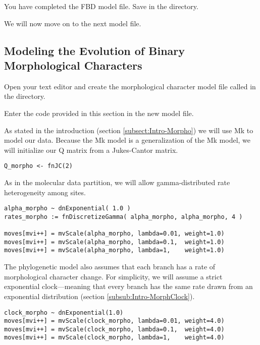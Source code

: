 {\begin{framed}
You have completed the FBD model file. Save  in the  directory.

We will now move on to the next model file.
\end{framed}}

\bigskip

\subsection{Modeling the Evolution of Binary Morphological Characters}\label{subsect:Exercise-ModelMorph}

{\begin{framed}
Open your text editor and create the morphological character model file called {\textcolor{red}{}} in the  directory.

Enter the \Rev code provided in this section in the new model file.
\end{framed}}

As stated in the introduction (section \ref{subsect:Intro-Morpho}) %
we will use Mk to model our data. 
Because the Mk model is a generalization of the Mk model, we will initialize our Q matrix from a Jukes-Cantor matrix.

{\tt \begin{snugshade*}
\begin{lstlisting}
Q_morpho <- fnJC(2)

\end{lstlisting}
\end{snugshade*}}


As in the molecular data partition, we will allow gamma-distributed rate heterogeneity among sites.
{\tt \begin{snugshade*}
\begin{lstlisting}
alpha_morpho ~ dnExponential( 1.0 )
rates_morpho := fnDiscretizeGamma( alpha_morpho, alpha_morpho, 4 )

moves[mvi++] = mvScale(alpha_morpho, lambda=0.01, weight=1.0)
moves[mvi++] = mvScale(alpha_morpho, lambda=0.1,  weight=1.0)
moves[mvi++] = mvScale(alpha_morpho, lambda=1,    weight=1.0)
\end{lstlisting}
\end{snugshade*}}

The phylogenetic model also assumes that each branch has a rate of morphological character change.
For simplicity, we will assume a strict exponential clock---meaning that every branch has the same rate drawn from an exponential distribution (section \ref{subsub:Intro-MorphClock}).
{\tt \begin{snugshade*}
\begin{lstlisting}
clock_morpho ~ dnExponential(1.0)
moves[mvi++] = mvScale(clock_morpho, lambda=0.01, weight=4.0)
moves[mvi++] = mvScale(clock_morpho, lambda=0.1,  weight=4.0)
moves[mvi++] = mvScale(clock_morpho, lambda=1,    weight=4.0)
\end{lstlisting}
\end{snugshade*}}

